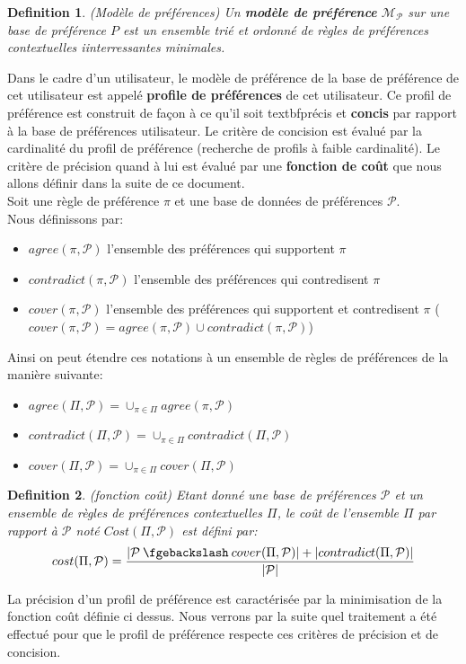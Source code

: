 \documentclass[a4paper,12pt,openany,oneside]{article}
\newcommand{\mysetminus}{\mathbin{\fgebackslash}}
\newtheorem{defn}{Definition} %
\begin{document}
\begin{defn}(Modèle de préférences)
Un \textbf{modèle de préférence} $\mathcal{M}_\mathcal{P}$ sur une base de préférence $P$ est un ensemble trié et ordonné de règles de préférences contextuelles iinterressantes minimales.
\end{defn}
Dans le cadre d'un utilisateur, le modèle de préférence de la base de préférence de cet utilisateur est appelé \textbf{profile de préférences} de cet utilisateur.
Ce profil de préférence est construit de façon à ce qu'il soit textbf{précis} et \textbf{concis} par rapport à la base de préférences utilisateur. Le critère de concision est évalué par la cardinalité du profil de préférence (recherche de profils à faible cardinalité). Le critère de précision quand à lui est évalué par une \textbf{fonction de coût} que nous allons définir dans la suite de ce document.\\
Soit une règle de préférence $\pi$ et une base de données de préférences $\mathcal{P}$. \\
Nous définissons par:
\begin{itemize}
	\item $agree(\pi,\mathcal{P})$ l'ensemble des préférences qui supportent $\pi$ 
	\item $contradict(\pi,\mathcal{P})$ l'ensemble des préférences qui contredisent $\pi$ 
	\item $cover(\pi,\mathcal{P})$ l'ensemble des préférences qui supportent et contredisent $\pi$ ($cover(\pi,\mathcal{P})=agree(\pi,\mathcal{P})\cup contradict(\pi,\mathcal{P})$) 
\end{itemize}

Ainsi on peut étendre ces notations à un ensemble de règles de préférences de la manière suivante:
\begin{itemize}
	\item $agree(\Pi,\mathcal{P})=\cup_{\pi \in \Pi} agree(\pi,\mathcal{P})$ 
	\item $contradict(\Pi,\mathcal{P}) =\cup_{\pi\in\Pi}contradict(\Pi,\mathcal{P})$
	\item $cover(\Pi,\mathcal{P})=\cup_{\pi\in\Pi}cover(\Pi,\mathcal{P})$
\end{itemize}

\begin{defn}(fonction coût)
Etant donné une base de préférences $\mathcal{P}$ et un ensemble de règles de préférences contextuelles $\Pi$, le coût de l'ensemble $\Pi$ par rapport à $\mathcal{P}$ noté $Cost(\Pi,\mathcal{P})$ est défini par:
\[
cost(\Pi,\mathcal{P})=\frac{|\mathcal{P}\mysetminus cover(\Pi,\mathcal{P})|+|contradict(\Pi,\mathcal{P})|}{|\mathcal{P}|}
\]
\end{defn}
La précision d'un profil de préférence est caractérisée par la minimisation de la fonction coût définie ci dessus.
Nous verrons par la suite quel traitement a été effectué pour que le profil de préférence respecte ces critères de précision et de concision.
\end{document}
